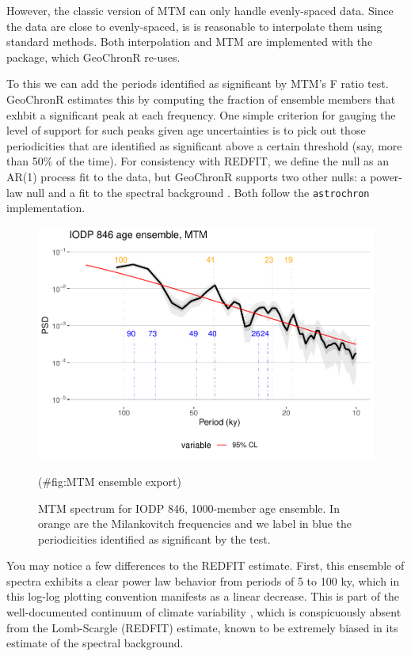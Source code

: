 \documentclass[gchron, manuscript]{copernicus}
\begin{document}
However, the classic version of MTM can only handle evenly-spaced data. Since the data are close to evenly-spaced, is is reasonable to interpolate them using standard methods. Both interpolation and MTM are implemented with the \citep[astrochron][]{astrochron} package, which GeoChronR re-uses.

To this we can add the periods identified as significant by MTM's F ratio test.
GeoChronR estimates this by computing the fraction of ensemble members that exhbit a significant peak at each frequency.
One simple criterion for gauging the level of support for such peaks given age uncertainties is to pick out those periodicities that are identified as significant above a certain threshold (say, more than 50\% of the time). For consistency with REDFIT, we define the null as an AR(1) process fit to the data, but GeoChronR supports two other nulls: a power-law null and a fit to the spectral background \citep{MannLees96}.
Both follow the \texttt{astrochron} implementation.

\begin{figure}
\includegraphics[width=12cm]{geoChronR-paper_files/figure-latex/MTM ensemble export-1} \caption{MTM spectrum for IODP 846, 1000-member age ensemble. In orange are the Milankovitch frequencies and we label in blue the periodicities identified as significant by the test.}(\#fig:MTM ensemble export)
\end{figure}

You may notice a few differences to the REDFIT estimate. First, this ensemble of spectra exhibits a clear power law behavior from periods of 5 to 100 ky, which in this log-log plotting convention manifests as a linear decrease. This is part of the well-documented continuum of climate variability \citep[\citet{ZhuPNAS2019}]{Huybers_Curry2006}, which is conspicuously absent from the Lomb-Scargle (REDFIT) estimate, known to be extremely biased in its estimate of the spectral background.
\end{document}
